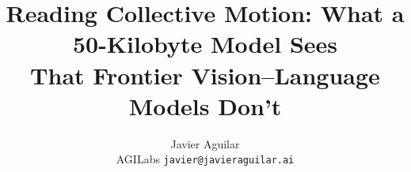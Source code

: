 \documentclass[11pt]{article}
\title{\textbf{Reading Collective Motion: What a 50-Kilobyte Model Sees\\That Frontier Vision--Language Models Don't}}
\author{Javier Aguilar\\ \small AGILabs \quad \texttt{javier@javieraguilar.ai}}
\date{}
\begin{document}
\maketitle
\begin{abstract}\end{abstract}

\end{document}
